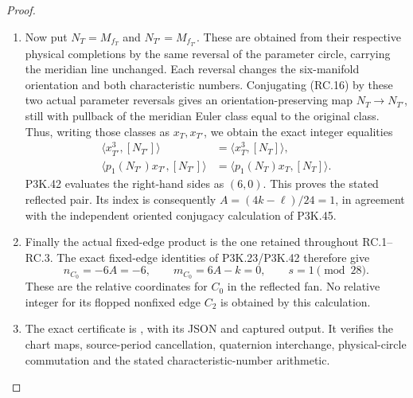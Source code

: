 \begin{proof}
\begin{enumerate}[label=\arabic*.]
\item Now put \(N_T=M_{f_T}\) and \(N_{T'}=M_{f_{T'}}\). These are obtained
from their respective physical completions by the same reversal of
the parameter circle, carrying the meridian line unchanged. Each
reversal changes the six-manifold orientation and both characteristic
numbers. Conjugating (RC.16) by these two actual parameter reversals
gives an orientation-preserving map \(N_T\to N_{T'}\), still with
pullback of the meridian Euler class equal to the original class.
Thus, writing those classes as \(x_T,x_{T'}\), we obtain the exact
integer equalities
\[
 \begin{aligned}
 \langle x_{T'}^3,[N_{T'}]\rangle
       &=\langle x_T^3,[N_T]\rangle,\\
 \langle p_1(N_{T'})x_{T'},[N_{T'}]\rangle
       &=\langle p_1(N_T)x_T,[N_T]\rangle.
 \end{aligned}                                               \tag{RC.17}
\]
P3K.42 evaluates the right-hand sides as \((6,0)\). This proves the
stated reflected pair. Its index is consequently \(A=(4k-\ell)/24=1\),
in agreement with the independent oriented conjugacy calculation
of P3K.45.

\item Finally the actual fixed-edge product is the one retained throughout
RC.1--RC.3. The exact fixed-edge identities of P3K.23/P3K.42 therefore
give
\[
        n_{C_0}=-6A=-6,\qquad
        m_{C_0}=6A-k=0,\qquad s=1\pmod {28}.         \tag{RC.18}
\]
These are the relative coordinates for \(C_0\) in the reflected fan.
No relative integer for its flopped nonfixed edge \(C_2\) is obtained
by this calculation.

\item The exact certificate is ,
with its JSON and captured output. It verifies the chart maps,
source-period cancellation, quaternion interchange, physical-circle
commutation and the stated characteristic-number arithmetic.

\end{enumerate}
\end{proof}